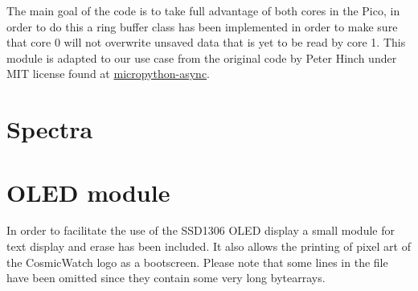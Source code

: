 The main goal of the code is to take full advantage of both cores in the Pico, in order to do this a ring buffer class has been implemented in order to make sure that core 0 will not overwrite unsaved data that is yet to be read by core 1. This module is adapted to our use case from the original code by Peter Hinch under MIT license found at \href{https://github.com/peterhinch/micropython-async/blob/master/v3/primitives/ringbuf_queue.py}{micropython-async}.



\section{Spectra}\label{sec:spectra.py}



\section{OLED module}

In order to facilitate the use of the SSD1306 OLED display a small module for text display and erase has been included. It also allows the printing of pixel art of the CosmicWatch logo as a bootscreen. Please note that some lines in the file have been omitted since they contain some very long bytearrays.

